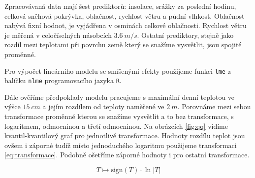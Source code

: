 Zpracovávaná data mají šest prediktorů: insolace, srážky za poslední hodinu, celková sněhová pokrývka, oblačnost, rychlost větru a půdní vlhkost. Oblačnost nabývá fixní hodnot, je vyjádřena v osminách celkové oblačnosti. Rychlost větru je měřená v celočíselných násobcích $\SI{3.6}{m/s}$. Ostatní prediktory, stejně jako rozdíl mezi teplotami při povrchu země který se snažíme vysvětlit, jsou spojité proměnné. 

Pro výpočet lineárního modelu se smíšenými efekty použijeme funkci \texttt{lme} z balíčku \texttt{nlme} programovacího jazyka \texttt{R}.

Dále ověříme předpoklady modelu pracujeme s maximální denní teplotou ve výšce $\SI{15}{cm}$ a jejím rozdílem od teploty naměřené ve $\SI{2}{m}$. Porovnáme mezi sebou transformace proměnné kterou se snažíme vysvětlit a to bez transformace, s logaritmem, odmocninou a třetí odmocninou. Na obrázcích \ref{fig:qq} vidíme kvantil-kvantilový graf pro jednotlivé transformace. Hodnoty rozdílu teplot jsou ovšem i záporné tudíž místo jednoduchého logaritmu použijeme transformaci \eqref{eq:transformace}. Podobně ošetříme záporné hodnoty i pro ostatní transformace.

$$ T \mapsto \mathrm{sign}(T)\cdot \ln\left|T\right|$$ \label{eq:transformace}

